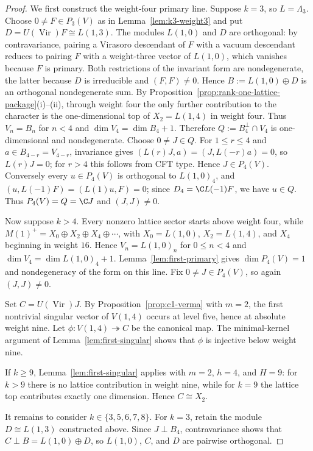 \documentclass[12pt,leqno]{amsart}
\numberwithin{equation}{section} \newtheorem{thm}{Theorem}[section] \newtheorem{lem}[thm]{Lemma} \newtheorem{ex}[thm]{Example} \newtheorem{prop}[thm]{Proposition} \newtheorem{cor}[thm]{Corollary} \newtheorem{defi}[thm]{Definition} \newtheorem{rmk}[thm]{Remark} \newtheorem{notation}[thm]{Notation}
\newcommand{\Vir}{\operatorname{Vir}}
\begin{document}
\begin{proof}
We first construct the weight-four primary line. Suppose $k=3$, so $L=\Lambda_3$. Choose $0\ne F\in P_3(V)$ as in Lemma~\ref{lem:k3-weight3} and put $D=U(\Vir)F\cong L(1,3)$. The modules $L(1,0)$ and $D$ are orthogonal: by contravariance, pairing a Virasoro descendant of $F$ with a vacuum descendant reduces to pairing $F$ with a weight-three vector of $L(1,0)$, which vanishes because $F$ is primary. Both restrictions of the invariant form are nondegenerate, the latter because $D$ is irreducible and $(F,F)\ne0$. Hence $B:=L(1,0)\oplus D$ is an orthogonal nondegenerate sum. By Proposition~\ref{prop:rank-one-lattice-package}(i)--(ii), through weight four the only further contribution to the character is the one-dimensional top of $X_2=L(1,4)$ in weight four. Thus $V_n=B_n$ for $n<4$ and $\dim V_4=\dim B_4+1$. Therefore $Q:=B_4^\perp\cap V_4$ is one-dimensional and nondegenerate. Choose $0\ne J\in Q$. For $1\le r\le4$ and $a\in B_{4-r}=V_{4-r}$, invariance gives \((L(r)J,a)=(J,L(-r)a)=0\), so $L(r)J=0$; for $r>4$ this follows from CFT type. Hence $J\in P_4(V)$. Conversely every $u\in P_4(V)$ is orthogonal to $L(1,0)_4$, and \((u,L(-1)F)=(L(1)u,F)=0\); since $D_4=\C L(-1)F$, we have $u\in Q$. Thus $P_4(V)=Q=\C J$ and $(J,J)\ne0$.

Now suppose $k>4$. Every nonzero lattice sector starts above weight four, while \(M(1)^+=X_0\oplus X_2\oplus X_4\oplus\cdots\), with $X_0=L(1,0)$, $X_2=L(1,4)$, and $X_4$ beginning in weight $16$. Hence $V_n=L(1,0)_n$ for $0\le n<4$ and $\dim V_4=\dim L(1,0)_4+1$. Lemma~\ref{lem:first-primary} gives $\dim P_4(V)=1$ and nondegeneracy of the form on this line. Fix $0\ne J\in P_4(V)$, so again $(J,J)\ne0$.

Set $C=U(\Vir)J$. By Proposition~\ref{prop:c1-verma} with $m=2$, the first nontrivial singular vector of $V(1,4)$ occurs at level five, hence at absolute weight nine. Let \(\phi:V(1,4)\twoheadrightarrow C\) be the canonical map. The minimal-kernel argument of Lemma~\ref{lem:first-singular} shows that $\phi$ is injective below weight nine.

If $k\ge9$, Lemma~\ref{lem:first-singular} applies with $m=2$, $h=4$, and $H=9$: for $k>9$ there is no lattice contribution in weight nine, while for $k=9$ the lattice top contributes exactly one dimension. Hence $C\cong X_2$.

It remains to consider $k\in\{3,5,6,7,8\}$. For $k=3$, retain the module $D\cong L(1,3)$ constructed above. Since $J\perp B_4$, contravariance shows that $C\perp B=L(1,0)\oplus D$, so $L(1,0)$, $C$, and $D$ are pairwise orthogonal.


\end{proof}
\end{document}
